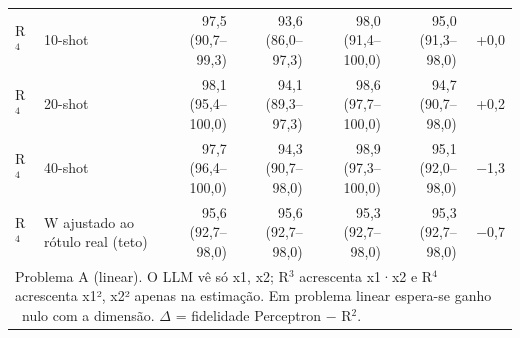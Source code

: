 \begin{table}[htbp]
\begin{tabular}{llrrrrr}
R$^4$ & 10-shot & 97,5 (90,7–99,3) & 93,6 (86,0–97,3) & 98,0 (91,4–100,0) & 95,0 (91,3–98,0) & +0,0 \\
R$^4$ & 20-shot & 98,1 (95,4–100,0) & 94,1 (89,3–97,3) & 98,6 (97,7–100,0) & 94,7 (90,7–98,0) & +0,2 \\
R$^4$ & 40-shot & 97,7 (96,4–100,0) & 94,3 (90,7–98,0) & 98,9 (97,3–100,0) & 95,1 (92,0–98,0) & $-$1,3 \\
R$^4$ & W ajustado ao rótulo real (teto) & 95,6 (92,7–98,0) & 95,6 (92,7–98,0) & 95,3 (92,7–98,0) & 95,3 (92,7–98,0) & $-$0,7 \\
\bottomrule
\multicolumn{7}{p{0.95\linewidth}}{\footnotesize Problema A (linear). O LLM vê só x1, x2; R$^3$ acrescenta x1·x2 e R$^4$ acrescenta x1², x2² apenas na estimação. Em problema linear espera-se ganho ~nulo com a dimensão. $\Delta$ = fidelidade Perceptron $-$ R$^2$.} \\
\end{tabular}
\end{table}
